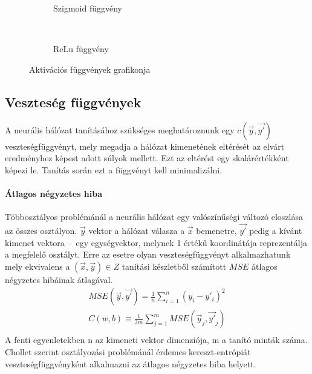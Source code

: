 \begin{figure}[h]
	\centering
	\begin{subfigure}[b]{0.3\textwidth}
		\def\svgwidth{0.5\columnwidth}
		
		\caption{Szigmoid függvény}
		\label{fig:sigmoid}
	\end{subfigure}
	~
	\begin{subfigure}[b]{0.3\textwidth}
		\def\svgwidth{0.5\columnwidth}
		
		\caption{ReLu függvény}
	\end{subfigure}
	\caption{Aktivációs függvények grafikonja}
\end{figure}

\subsection{Veszteség függvények}
A neurális hálózat tanításához szükséges meghatároznunk egy $c(\vec{y},\vec{y'})$ veszteségfüggvényt, mely megadja a hálózat kimenetének eltérését az elvárt eredményhez képest adott súlyok mellett. Ezt az eltérést egy skalárértékként képezi le. Tanítás során ezt a függvényt kell minimalizálni.

\paragraph[MSE]{Átlagos négyzetes hiba}\label{par:mse}
Többosztályos problémánál a neurális hálózat egy valószínűségi változó eloszlása az összes osztályon. $\vec{y}$ vektor a hálózat válasza a $\vec{x}$ bemenetre, $\vec{y'}$ pedig a kívánt kimenet vektora --~egy egységvektor, melynek 1 értékű koordinátája reprezentálja a megfelelő osztályt. Erre az esetre olyan veszteségfüggvényt alkalmazhatunk mely ekvivalens a $(\vec{x},\vec{y})\in Z$ tanítási készletből számított $MSE$ átlagos négyzetes hibáinak átlagával.\cite{nielsen2015}
\begin{align*}
	MSE(\vec{y},\vec{y'}) = \frac{1}{n}\sum_{i=1}^{n} (y_i - y'_i)^2\\
	C(w,b) \equiv \frac{1}{2m}\sum_{j=1}^{m} MSE(\vec{y}_j,\vec{y'}_j)\\
\end{align*}
A fenti egyenletekben n az kimeneti vektor dimenziója, m a tanító minták száma.
Chollet szerint osztályozási problémánál érdemes kereszt-entrópiát veszteségfüggvényként alkalmazni az átlagos négyzetes hiba helyett.\cite{chollet}

